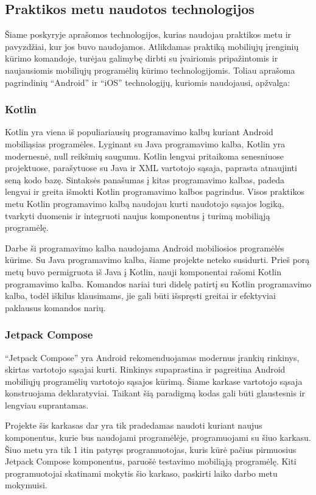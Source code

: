 \newpage

\subsection{Praktikos metu naudotos technologijos}
Šiame poskyryje aprašomos technologijos, kurias naudojau praktikos metu ir pavyzdžiai, kur jos buvo naudojamos. 
Atlikdamas praktiką mobiliųjų įrenginių kūrimo komandoje, turėjau galimybę dirbti su įvairiomis pripažintomis ir naujausiomis mobiliųjų programėlių kūrimo technologijomis. Toliau aprašoma pagrindinių \enquote{Android} ir \enquote{iOS} technologijų, kuriomis naudojausi, apžvalga:

\subsubsection{Kotlin}
Kotlin yra viena iš populiariausių programavimo kalbų kuriant Android mobiliąsias programėles. Lyginant su Java programavimo kalba, Kotlin yra modernesnė, null reikšmių saugumu. Kotlin lengvai pritaikoma senesniuose projektuose, parašytuose su Java ir XML vartotojo sąsaja, paprasta atnaujinti seną kodo bazę. Sintaksės panašumas į kitas programavimo kalbas, padeda lengvai ir greita išmokti Kotlin programavimo kalbos pagrindus.
Visos praktikos metu Kotlin programavimo kalbą naudojau kurti naudotojo sąsajos logiką, tvarkyti duomenis ir integruoti naujus komponentus į turimą mobiliąją programėlę.

Darbe ši programavimo kalba naudojama Android mobiliosios programėlės kūrime. Su Java programavimo kalba, šiame projekte neteko susidurti. Prieš porą metų buvo permigruota iš Java į Kotlin, nauji komponentai rašomi Kotlin programavimo kalba.
Komandos nariai turi didelę patirtį su Kotlin programavimo kalba, todėl iškilus klausimams, jie gali būti išspręsti greitai ir efektyviai paklausus komandos narių.

\subsubsection{Jetpack Compose}

\enquote{Jetpack Compose} yra Android rekomenduojamas modernus įrankių rinkinys, skirtas vartotojo sąsajai kurti. Rinkinys supaprastina ir pagreitina Android mobiliųjų programėlių vartotojo sąsajos kūrimą. Šiame karkase vartotojo sąsaja konstruojama deklaratyviai. Taikant šią paradigmą kodas gali būti glaustesnis ir lengviau suprantamas.

Projekte šis karkasas dar yra tik pradedamas naudoti kuriant naujus komponentus, kurie bus naudojami programėlėje, programuojami su šiuo karkasu. Šiuo metu yra tik 1 itin patyręs programuotojas, kuris kūrė pačius pirmuosius Jetpack Compose komponentus, paruošė testavimo mobiliąją programėlę. Kiti programuotojai skatinami mokytis šio karkaso, paskirti laiko darbo metu mokymuisi. 

